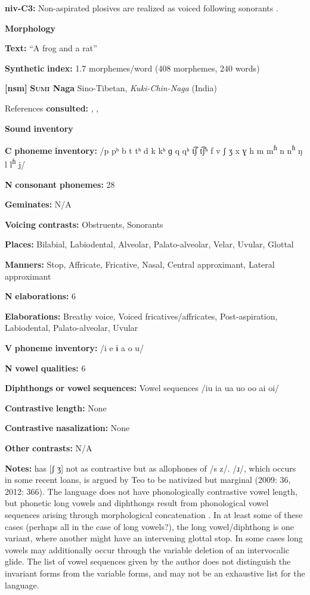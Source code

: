 \textbf{niv-C3:} Non-aspirated plosives are realized as voiced following sonorants \citep[25]{Shiraishi2006}.

\textbf{Morphology}

\textbf{Text:} “A frog and a rat” \citep[58-61]{Gruzdeva1998}

\textbf{Synthetic} \textbf{index:} 1.7 morphemes/word (408 morphemes, 240 words)

\textbf{[nsm]}   \textbf{\textsc{Sumi} \textbf{Naga}}  Sino-Tibetan, \textit{Kuki-Chin-Naga} (India)

References \textbf{consulted:} \citet{Sreedhar1980}, \citet{Teo2009}, \citet{Teo2012}

\textbf{Sound} \textbf{inventory}

\textbf{C} \textbf{phoneme} \textbf{inventory:} /p pʰ b t tʰ d k kʰ ɡ q qʰ t͡ʃ t͡ʃʰ f v ʃ ʒ x ɣ h m m\textsuperscript{ɦ} n n\textsuperscript{ɦ} ŋ l l\textsuperscript{ɦ} j/

\textbf{N} \textbf{consonant} \textbf{phonemes:} 28

\textbf{Geminates:} N/A

\textbf{Voicing} \textbf{contrasts:} Obstruents, Sonorants

\textbf{Places:} Bilabial, Labiodental, Alveolar, Palato-alveolar, Velar, Uvular, Glottal

\textbf{Manners:} Stop, Affricate, Fricative, Nasal, Central approximant, Lateral approximant

\textbf{N} \textbf{elaborations:} 6

\textbf{Elaborations:} Breathy voice, Voiced fricatives/affricates, Post-aspiration, Labiodental, Palato-alveolar, Uvular

\textbf{V} \textbf{phoneme} \textbf{inventory:} /i e ɨ a o u/

\textbf{N} \textbf{vowel} \textbf{qualities:} 6

\textbf{Diphthongs} \textbf{or} \textbf{vowel} \textbf{sequences:} Vowel sequences /iu ia ua uo oo ai oi/

\textbf{Contrastive} \textbf{length:} None

\textbf{Contrastive} \textbf{nasalization:} None

\textbf{Other} \textbf{contrasts:} N/A

\textbf{Notes:} \citet{Sreedhar1980} has [ʃ ʒ] not as contrastive but as allophones of /s z/. /ɹ/, which occurs in some recent loans, is argued by Teo to be nativized but marginal (2009: 36, 2012: 366). The language does not have phonologically contrastive vowel length, but phonetic long vowels and diphthongs result from phonological vowel sequences arising through morphological concatenation \citep[58-9]{Teo2009}. In at least some of these cases (perhaps all in the case of long vowels?), the long vowel/diphthong is one variant, where another might have an intervening glottal stop. In some cases long vowels may additionally occur through the variable deletion of an intervocalic glide. The list of vowel sequences given by the author does not distinguish the invariant forms from the variable forms, and may not be an exhaustive list for the language.

